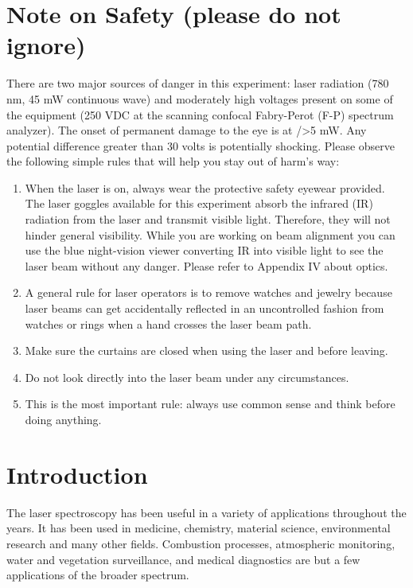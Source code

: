 \documentclass{../lab}
\begin{document}
\section{Note on Safety (please do not ignore)}

There are two major sources of danger in this experiment: laser radiation (780 nm, 45 mW continuous wave) and moderately high voltages present on some of the equipment (250 VDC at the scanning confocal Fabry-Perot (F-P) spectrum analyzer). The onset of permanent damage to the eye is at />5 mW. Any potential difference greater than 30 volts is potentially shocking. Please observe the following simple rules that will help you stay out of harm's way:

\begin{enumerate}
    \item When the laser is on, always wear the protective safety eyewear provided. The laser goggles available for this experiment absorb the infrared (IR) radiation from the laser and transmit visible light. Therefore, they will not hinder general visibility. While you are working on beam alignment you can use the blue night-vision viewer converting IR into visible light to see the laser beam without any danger. Please refer to Appendix IV about optics.

    \item A general rule for laser operators is to remove watches and jewelry because laser beams can get accidentally reflected in an uncontrolled fashion from watches or rings when a hand crosses the laser beam path.

    \item Make sure the curtains are closed when using the laser and before leaving.

    \item Do not look directly into the laser beam under any circumstances.

    \item This is the most important rule: always use common sense and think before doing anything.

\end{enumerate}

\section{Introduction}

The laser spectroscopy has been useful in a variety of applications throughout the years. It has been used in medicine, chemistry, material science, environmental research and many other fields. Combustion processes, atmospheric monitoring, water and vegetation surveillance, and medical diagnostics are but a few applications of the broader spectrum.
\end{document}
